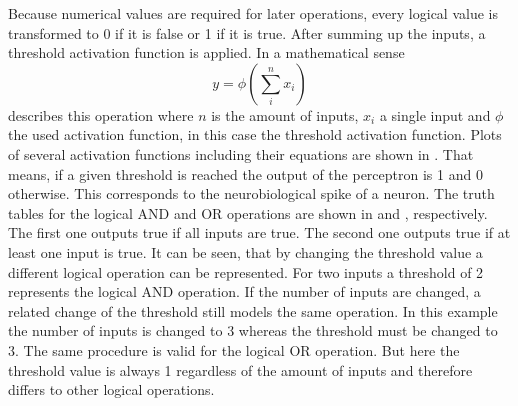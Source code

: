 Because numerical values are required for later operations, every logical value is transformed to 0 if it is false or 1 if it is true.
After summing up the inputs, a threshold activation function is applied.
In a mathematical sense
\begin{equation}
	\label{eq:neuron-mcculloch}
	y = \phi \left( \sum_{i}^{n} x_i \right)
\end{equation}
describes this operation where $n$ is the amount of inputs, $x_i$ a single input and $\phi$ the used activation function, in this case the threshold activation function.
Plots of several activation functions including their equations are shown in .
That means, if a given threshold is reached the output of the perceptron is 1 and 0 otherwise.
This corresponds to the neurobiological spike of a neuron.
The truth tables for the logical AND and OR operations are shown in  and , respectively.
The first one outputs true if all inputs are true.
The second one outputs true if at least one input is true.
It can be seen, that by changing the threshold value a different logical operation can be represented.
For two inputs a threshold of 2 represents the logical AND operation.
If the number of inputs are changed, a related change of the threshold still models the same operation.
In this example the number of inputs is changed to 3 whereas the threshold must be changed to 3.
The same procedure is valid for the logical OR operation.
But here the threshold value is always 1 regardless of the amount of inputs and therefore differs to other logical operations.
